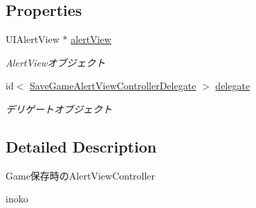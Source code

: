 \subsection*{Properties}
\begin{DoxyCompactItemize}
\item 
\hypertarget{interface_save_game_alert_view_controller_ab6617da5f14b284c4b5cfe09874dffe6}{
UIAlertView $\ast$ \hyperlink{interface_save_game_alert_view_controller_ab6617da5f14b284c4b5cfe09874dffe6}{alertView}}
\label{interface_save_game_alert_view_controller_ab6617da5f14b284c4b5cfe09874dffe6}

\begin{DoxyCompactList}\small\item\em AlertViewオブジェクト \end{DoxyCompactList}\item 
\hypertarget{interface_save_game_alert_view_controller_a38b518815abc0ea598a60cb9d5cd736f}{
id$<$ \hyperlink{protocol_save_game_alert_view_controller_delegate-p}{SaveGameAlertViewControllerDelegate} $>$ \hyperlink{interface_save_game_alert_view_controller_a38b518815abc0ea598a60cb9d5cd736f}{delegate}}
\label{interface_save_game_alert_view_controller_a38b518815abc0ea598a60cb9d5cd736f}

\begin{DoxyCompactList}\small\item\em デリゲートオブジェクト \end{DoxyCompactList}\end{DoxyCompactItemize}


\subsection{Detailed Description}
Game保存時のAlertViewController

inoko 

